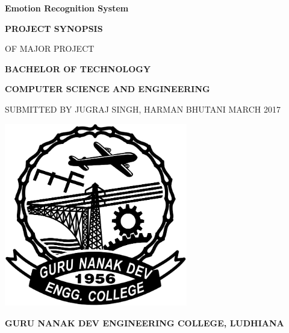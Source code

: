 \begin{titlepage}
	\centering
	\fontsize{24}{0}\textbf{Emotion Recognition System}
	
	\vspace{2cm}
	\fontsize{14}{0}\textbf{PROJECT SYNOPSIS}
	
	\vspace{0.5cm}
	\fontsize{12}{0}\textnormal{OF MAJOR PROJECT}
	
	\vspace{2cm}
	\fontsize{14}{0}\textbf{BACHELOR OF TECHNOLOGY}
	
	\vspace{1cm}
	\fontsize{16}{0}\textbf{COMPUTER SCIENCE AND ENGINEERING}
	
	\vspace{2cm}
	\fontsize{14}{0}
	\textnormal{
		SUBMITTED BY
		\vskip 0.25cm
		JUGRAJ SINGH, HARMAN BHUTANI
		\vskip 0.15cm
		MARCH 2017}
	
	\vskip 2.25cm
	\includegraphics[width=8cm, height=8cm]{Images/GNDEC_BLACK.png}
	
	\vspace*{\fill}
	\fontsize{16}{0}
	\textbf{GURU NANAK DEV ENGINEERING COLLEGE, LUDHIANA}
\end{titlepage}
